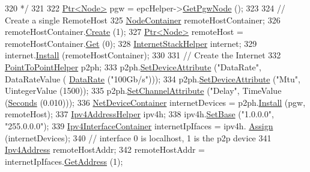 \begin{DoxyCode}
320 \textcolor{comment}{*/}
321 
322         \hyperlink{classns3_1_1Ptr}{Ptr<Node>} pgw = epcHelper->\hyperlink{classns3_1_1MmWavePointToPointEpcHelper_a586f072ee5b09376531ba605b3fed05f}{GetPgwNode} ();
323 
324         \textcolor{comment}{// Create a single RemoteHost}
325         \hyperlink{classns3_1_1NodeContainer}{NodeContainer} remoteHostContainer;
326         remoteHostContainer.\hyperlink{classns3_1_1NodeContainer_a787f059e2813e8b951cc6914d11dfe69}{Create} (1);
327         \hyperlink{classns3_1_1Ptr}{Ptr<Node>} remoteHost = remoteHostContainer.\hyperlink{classns3_1_1NodeContainer_a9ed96e2ecc22e0f5a3d4842eb9bf90bf}{Get} (0);
328         \hyperlink{classns3_1_1InternetStackHelper}{InternetStackHelper} internet;
329         internet.\hyperlink{classns3_1_1InternetStackHelper_a6645b412f31283d2d9bc3d8a95cebbc0}{Install} (remoteHostContainer);
330 
331         \textcolor{comment}{// Create the Internet}
332         \hyperlink{classns3_1_1PointToPointHelper}{PointToPointHelper} p2ph;
333         p2ph.\hyperlink{classns3_1_1PointToPointHelper_a4577f5ab8c387e5528af2e0fbab1152e}{SetDeviceAttribute} (\textcolor{stringliteral}{"DataRate"}, DataRateValue (
      \hyperlink{classns3_1_1DataRate}{DataRate} (\textcolor{stringliteral}{"100Gb/s"})));
334         p2ph.\hyperlink{classns3_1_1PointToPointHelper_a4577f5ab8c387e5528af2e0fbab1152e}{SetDeviceAttribute} (\textcolor{stringliteral}{"Mtu"}, UintegerValue (1500));
335         p2ph.\hyperlink{classns3_1_1PointToPointHelper_a6b5317fd17fb61e5a53f8d66a90b63b9}{SetChannelAttribute} (\textcolor{stringliteral}{"Delay"}, TimeValue (\hyperlink{group__timecivil_ga33c34b816f8ff6628e33d5c8e9713b9e}{Seconds} (0.010)));
336         \hyperlink{classns3_1_1NetDeviceContainer}{NetDeviceContainer} internetDevices = p2ph.\hyperlink{classns3_1_1PointToPointHelper_ab9162fea3e88722666fed1106df1f9ec}{Install} (pgw, remoteHost);
337         \hyperlink{classns3_1_1Ipv4AddressHelper}{Ipv4AddressHelper} ipv4h;
338         ipv4h.\hyperlink{classns3_1_1Ipv4AddressHelper_acf7b16dd25bac67e00f5e25f90a9a035}{SetBase} (\textcolor{stringliteral}{"1.0.0.0"}, \textcolor{stringliteral}{"255.0.0.0"});
339         \hyperlink{classns3_1_1Ipv4InterfaceContainer}{Ipv4InterfaceContainer} internetIpIfaces = ipv4h.
      \hyperlink{classns3_1_1Ipv4AddressHelper_af8e7f4a1a7e74c00014a1eac445a27af}{Assign} (internetDevices);
340         \textcolor{comment}{// interface 0 is localhost, 1 is the p2p device}
341         \hyperlink{classns3_1_1Ipv4Address}{Ipv4Address} remoteHostAddr;
342         remoteHostAddr = internetIpIfaces.\hyperlink{classns3_1_1Ipv4InterfaceContainer_ae63208dcd222be986822937ee4aa828c}{GetAddress} (1);

\end{DoxyCode}

